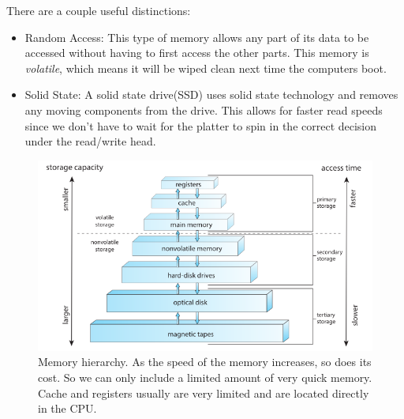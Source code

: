 \documentclass{tufte-handout}
\begin{document}
There are a couple useful distinctions:
\begin{itemize}
	\item Random Access: This type of memory allows any part of its data to be accessed
			without having to first access the other parts. This memory is 
			\textit{volatile}, which means it will be wiped clean next time the computers
			boot.
	\item Solid State: A solid state drive(SSD) uses solid state technology and removes
			any moving components from the drive. This allows for faster read speeds since
			we don't have to wait for the platter to spin in the correct decision 
			under the read/write head.
\end{itemize}

\begin{center}
	\begin{figure}
		\includegraphics[scale=0.3]{mem_hierarchy}
		\caption{Memory hierarchy. As the speed of the memory increases, so does its
			cost. So we can only include a limited amount of very quick memory. Cache
			and registers usually are very limited and are located directly in the CPU.}
	\end{figure}
\end{center}
\end{document}
